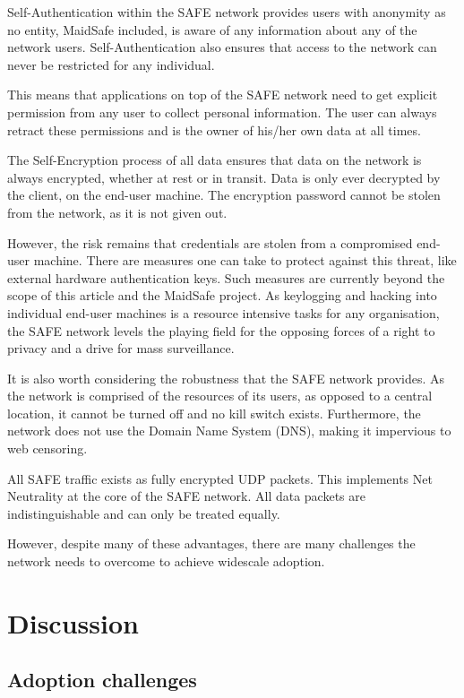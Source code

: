 \documentclass[twocolumn,english]{article}
\begin{document}
Self-Authentication within the SAFE network provides users
with anonymity as no entity, MaidSafe included, is aware of any information
about any of the network users. Self-Authentication also ensures
that access to the network can never be restricted for any individual.

This means that applications on top of the SAFE network  need to get explicit permission from any user to collect personal information.  The user can always retract these permissions and is the owner of his/her own data at all times.

The Self-Encryption process of all data ensures that data on the network is
always encrypted, whether at rest or in transit. Data is only
ever decrypted by the client, on the end-user machine.  The encryption
password cannot be stolen from the network, as it is not given out.  

However, the risk remains that credentials are stolen from a compromised end-user machine.  There are measures one can take to protect against this threat, like external hardware authentication keys.  Such measures are currently beyond the scope of this article and the MaidSafe project.  As keylogging and hacking into individual end-user machines is a resource intensive tasks for any organisation, the SAFE network levels the playing field for the opposing forces of a right to privacy and a drive for mass surveillance.

It is also worth considering the robustness that the SAFE network
provides. As the network is comprised of the resources of its users,
as opposed to a central location, it cannot be turned off and no kill
switch exists. Furthermore, the network does not use the Domain Name
System (DNS), making it impervious to web censoring. %

All SAFE traffic exists as fully encrypted UDP packets. This implements Net Neutrality at the core of the SAFE network.  All data packets are indistinguishable and can only be treated equally.

However, despite many of these advantages, there
are many challenges the network needs to overcome to achieve
widescale adoption.


\section{Discussion}

\subsection{Adoption challenges}
\end{document}
